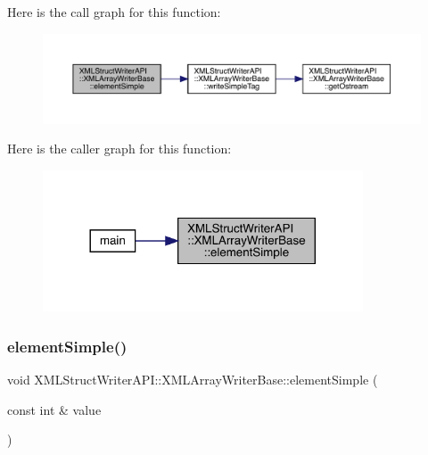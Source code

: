 Here is the call graph for this function\+:
\nopagebreak
\begin{figure}[H]
\begin{center}
\leavevmode
\includegraphics[width=350pt]{d5/d41/classXMLStructWriterAPI_1_1XMLArrayWriterBase_a4523996304d9e9468147d12602257364_cgraph}
\end{center}
\end{figure}
Here is the caller graph for this function\+:\nopagebreak
\begin{figure}[H]
\begin{center}
\leavevmode
\includegraphics[width=269pt]{d5/d41/classXMLStructWriterAPI_1_1XMLArrayWriterBase_a4523996304d9e9468147d12602257364_icgraph}
\end{center}
\end{figure}
\mbox{\label{classXMLStructWriterAPI_1_1XMLArrayWriterBase_a4523996304d9e9468147d12602257364}} 
\subsubsection{\texorpdfstring{elementSimple()}{elementSimple()}\hspace{0.1cm}{\footnotesize\ttfamily [2/8]}}
{\footnotesize\ttfamily void X\+M\+L\+Struct\+Writer\+A\+P\+I\+::\+X\+M\+L\+Array\+Writer\+Base\+::element\+Simple (\begin{DoxyParamCaption}\item[{const int \&}]{value }\end{DoxyParamCaption})\hspace{0.3cm}{\ttfamily [inline]}}

